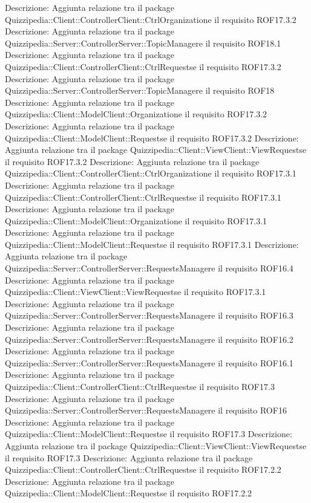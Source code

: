 Descrizione: Aggiunta relazione tra il package Quizzipedia::Client::ControllerClient::CtrlOrganizatione il requisito ROF17.3.2 
Descrizione: Aggiunta relazione tra il package Quizzipedia::Server::ControllerServer::TopicManagere il requisito ROF18.1 
Descrizione: Aggiunta relazione tra il package Quizzipedia::Client::ControllerClient::CtrlRequestse il requisito ROF17.3.2 
Descrizione: Aggiunta relazione tra il package Quizzipedia::Server::ControllerServer::TopicManagere il requisito ROF18 
Descrizione: Aggiunta relazione tra il package Quizzipedia::Client::ModelClient::Organizatione il requisito ROF17.3.2 
Descrizione: Aggiunta relazione tra il package Quizzipedia::Client::ModelClient::Requestse il requisito ROF17.3.2 
Descrizione: Aggiunta relazione tra il package Quizzipedia::Client::ViewClient::ViewRequestse il requisito ROF17.3.2 
Descrizione: Aggiunta relazione tra il package Quizzipedia::Client::ControllerClient::CtrlOrganizatione il requisito ROF17.3.1 
Descrizione: Aggiunta relazione tra il package Quizzipedia::Client::ControllerClient::CtrlRequestse il requisito ROF17.3.1 
Descrizione: Aggiunta relazione tra il package Quizzipedia::Client::ModelClient::Organizatione il requisito ROF17.3.1 
Descrizione: Aggiunta relazione tra il package Quizzipedia::Client::ModelClient::Requestse il requisito ROF17.3.1 
Descrizione: Aggiunta relazione tra il package Quizzipedia::Server::ControllerServer::RequestsManagere il requisito ROF16.4 
Descrizione: Aggiunta relazione tra il package Quizzipedia::Client::ViewClient::ViewRequestse il requisito ROF17.3.1 
Descrizione: Aggiunta relazione tra il package Quizzipedia::Server::ControllerServer::RequestsManagere il requisito ROF16.3 
Descrizione: Aggiunta relazione tra il package Quizzipedia::Server::ControllerServer::RequestsManagere il requisito ROF16.2 
Descrizione: Aggiunta relazione tra il package Quizzipedia::Server::ControllerServer::RequestsManagere il requisito ROF16.1 
Descrizione: Aggiunta relazione tra il package Quizzipedia::Client::ControllerClient::CtrlRequestse il requisito ROF17.3 
Descrizione: Aggiunta relazione tra il package Quizzipedia::Server::ControllerServer::RequestsManagere il requisito ROF16 
Descrizione: Aggiunta relazione tra il package Quizzipedia::Client::ModelClient::Requestse il requisito ROF17.3 
Descrizione: Aggiunta relazione tra il package Quizzipedia::Client::ViewClient::ViewRequestse il requisito ROF17.3 
Descrizione: Aggiunta relazione tra il package Quizzipedia::Client::ControllerClient::CtrlRequestse il requisito ROF17.2.2 
Descrizione: Aggiunta relazione tra il package Quizzipedia::Client::ModelClient::Requestse il requisito ROF17.2.2 
